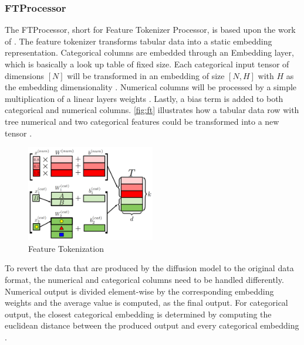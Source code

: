 \subsubsection*{FTProcessor}
\label{ch:FTProcessor}

The FTProcessor, short for Feature Tokenizer Processor, is based upon the work of \cite{zheng2022DiffusionModelsMissing, gorishniy2021RevisitingDeepLearning}.
The feature tokenizer transforms tabular data into a static embedding representation.
Categorical columns are embedded through an Embedding layer, which is basically a look up table \cite{EmbeddingPyTorch13} of fixed size.
Each categorical input tensor of dimensions $[N]$ will be transformed in an embedding of size $[N,H]$ with $H$ as the embedding dimensionality \cite{gorishniy2021RevisitingDeepLearning}.
Numerical columns will be processed by a simple multiplication of a linear layers weights \cite{gorishniy2021RevisitingDeepLearning}.
Lastly, a bias term is added to both categorical and numerical columns.
\autoref{fig:ft} illustrates how a tabular data row with tree numerical and two categorical features could be transformed into a new tensor \cite[Figure 2a, p.4]{gorishniy2021RevisitingDeepLearning}.

\begin{figure}[h]
	\centering
	\includegraphics[width=0.5\textwidth]{images/ft.png}
	\caption{Feature Tokenization \cite[Figure 2a, p.4]{gorishniy2021RevisitingDeepLearning}}
	\label{fig:ft}
\end{figure}

To revert the data that are produced by the diffusion model to the original data format, the numerical and categorical columns need to be handled differently.
Numerical output is divided element-wise by the corresponding embedding weights and the average value is computed, as the final output\cite{zheng2022DiffusionModelsMissing}.
For categorical output, the closest categorical embedding is determined by computing the euclidean distance between the produced output and every categorical embedding \cite{zheng2022DiffusionModelsMissing}.

